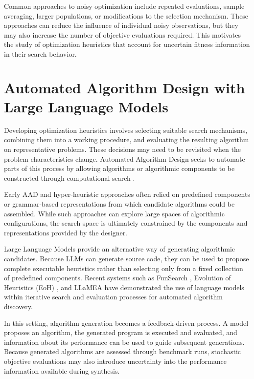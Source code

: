 Common approaches to noisy optimization include repeated evaluations, sample
averaging, larger populations, or modifications to the selection mechanism.
These approaches can reduce the influence of individual noisy observations, but
they may also increase the number of objective evaluations required. This
motivates the study of optimization heuristics that account for uncertain
fitness information in their search behavior.

\section{Automated Algorithm Design with Large Language Models}
\label{sec:intro_aad}

Developing optimization heuristics involves selecting suitable search
mechanisms, combining them into a working procedure, and evaluating the
resulting algorithm on representative problems. These decisions may need to be
revisited when the problem characteristics change. Automated Algorithm Design
seeks to automate parts of this process by allowing algorithms or algorithmic
components to be constructed through computational search
\cite{Burke2013, vanRijn2016}.

Early AAD and hyper-heuristic approaches often relied on predefined components
or grammar-based representations from which candidate algorithms could be
assembled. While such approaches can explore large spaces of algorithmic
configurations, the search space is ultimately constrained by the components and
representations provided by the designer.

Large Language Models provide an alternative way of generating algorithmic
candidates. Because LLMs can generate source code, they can be used to propose
complete executable heuristics rather than selecting only from a fixed
collection of predefined components. Recent systems such as FunSearch
\cite{Romera2023}, Evolution of Heuristics (EoH) \cite{Liu2024}, and LLaMEA
\cite{LLaMEA2024} have demonstrated the use of language models within iterative
search and evaluation processes for automated algorithm discovery.

In this setting, algorithm generation becomes a feedback-driven process. A model
proposes an algorithm, the generated program is executed and evaluated, and
information about its performance can be used to guide subsequent generations.
Because generated algorithms are assessed through benchmark runs,
stochastic objective evaluations may also introduce uncertainty
into the performance information available during synthesis.

